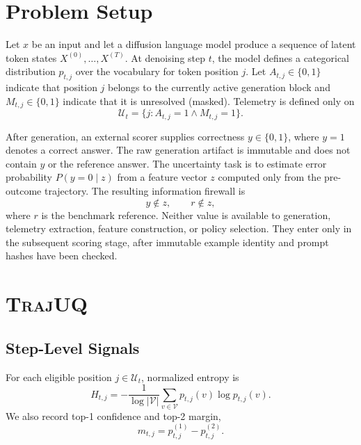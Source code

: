 \documentclass[10pt]{article}
\newcommand{\method}{\textsc{TrajUQ}\xspace}
\begin{document}
\section{Problem Setup}

Let $x$ be an input and let a diffusion language model produce a sequence of latent token states
$X^{(0)},\ldots,X^{(T)}$.
At denoising step $t$, the model defines a categorical distribution
$p_{t,j}$ over the vocabulary for token position $j$.
Let $A_{t,j}\in\{0,1\}$ indicate that position $j$ belongs to the currently active generation block and
$M_{t,j}\in\{0,1\}$ indicate that it is unresolved (masked).
Telemetry is defined only on
\begin{equation}
\mathcal{U}_t = \{j: A_{t,j}=1 \land M_{t,j}=1\}.
\end{equation}

After generation, an external scorer supplies correctness
$y\in\{0,1\}$, where $y=1$ denotes a correct answer.
The raw generation artifact is immutable and does not contain $y$ or the reference answer.
The uncertainty task is to estimate error probability
$P(y=0\mid z)$ from a feature vector $z$ computed only from the pre-outcome trajectory.
The resulting information firewall is
\begin{equation}
\boxed{y\notin z,\qquad r\notin z,}
\label{eq:outcome-firewall}
\end{equation}
where $r$ is the benchmark reference. Neither value is available to generation,
telemetry extraction, feature construction, or policy selection. They enter
only in the subsequent scoring stage, after immutable example identity and
prompt hashes have been checked.

\section{\method}

\subsection{Step-Level Signals}

For each eligible position $j\in\mathcal{U}_t$, normalized entropy is
\begin{equation}
H_{t,j} =
-\frac{1}{\log |\mathcal{V}|}
\sum_{v\in\mathcal{V}} p_{t,j}(v)\log p_{t,j}(v).
\end{equation}
We also record top-1 confidence and top-2 margin,
\begin{equation}
m_{t,j}=p^{(1)}_{t,j}-p^{(2)}_{t,j}.
\end{equation}
\end{document}
